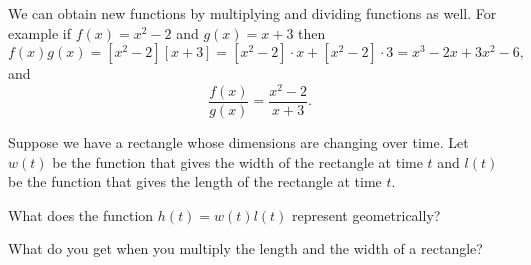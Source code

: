 \documentclass{ximera}
\begin{document}
We can obtain new functions by multiplying and dividing functions as well. 
For example if $f(x)=x^2-2$ and $g(x)=x+3$ then 
\[
f(x)g(x)=[x^2-2][x+3]=[x^2-2]\cdot x+[x^2-2]\cdot 3=x^3-2x+3x^2-6,
\]
and
\[
\frac{f(x)}{g(x)}=\frac{x^2-2}{x+3}.
\]


\begin{question}
Suppose we have a rectangle whose dimensions are changing over time. Let $w(t)$ be the function that gives the width of the rectangle at time $t$ and $l(t)$ be the function that gives the length of the rectangle at time $t$.

What does the function $h(t)=w(t)l(t)$ represent geometrically?

\begin{multipleChoice}
\end{multipleChoice}
\begin{hint}
What do you get when you multiply the length and the width of a rectangle? 
\end{hint}

\end{question}
\end{document}

